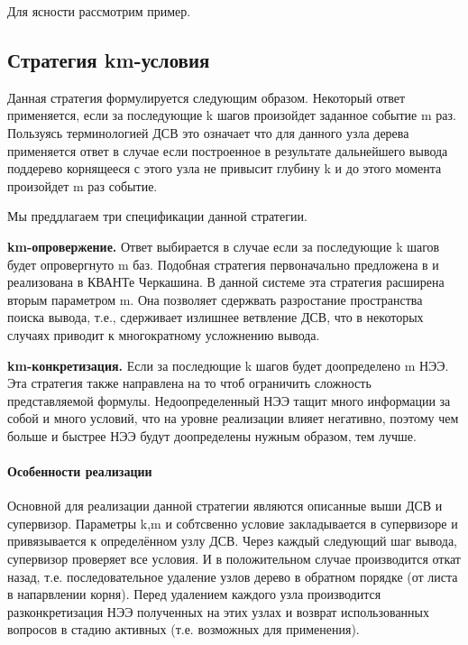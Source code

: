 Для ясности рассмотрим пример.



\subsection{Стратегия km-условия}
Данная стратегия формулируется следующим образом. Некоторый ответ применяется, если за последующие k шагов произойдет заданное событие m раз. Пользуясь терминологией ДСВ это означает что для данного узла дерева применяется ответ в случае если построенное в результате дальнейшего вывода поддерево корнящееся с этого узла не привысит глубину k и до этого момента произойдет m раз событие. 

Мы преддлагаем три спецификации данной стратегии.

\textbf{km-опровержение.} Ответ выбирается в случае если за последующие k шагов будет опровергнуто m баз. Подобная стратегия первоначально предложена в \cite{ICDS2000} и реализована в КВАНТе Черкашина. В данной системе эта стратегия расширена вторым параметром m. Она позволяет сдержвать разростание пространства поиска вывода, т.е., сдерживает излишнее ветвление ДСВ, что в некоторых случаях приводит к многократному усложнению вывода.

\textbf{km-конкретизация.} Если за последющие k шагов будет доопределено m НЭЭ. Эта стратегия также направлена на то чтоб ограничить сложность представляемой формулы. Недоопределенный НЭЭ тащит много информации за собой и много условий, что на уровне реализации влияет негативно, поэтому чем больше и быстрее НЭЭ будут доопределены нужным образом, тем лучше.

\paragraph{Особенности реализации}
Основной для реализации данной стратегии являются описанные выши ДСВ и супервизор. Параметры k,m и собтсвенно условие закладывается в супервизоре и привязывается к определённом узлу ДСВ. Через каждый следующий шаг вывода, супервизор проверяет все условия. И в положительном случае производится откат назад, т.е. последовательное удаление узлов дерево в обратном порядке (от листа в напарвлении корня). Перед удалением каждого узла производится разконкретизация НЭЭ полученных на этих узлах и возврат использованных вопросов в стадию активных (т.е. возможных для применения).

